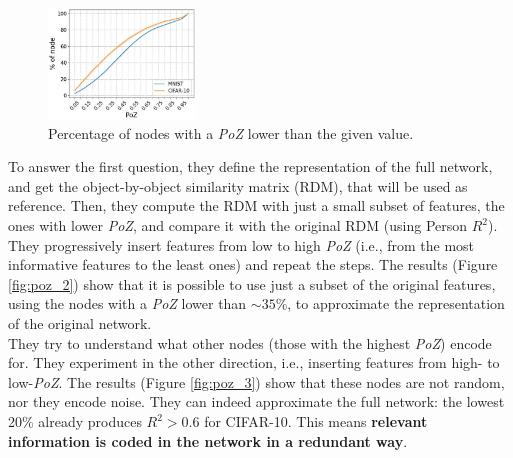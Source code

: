 \begin{figure}
  \centering
  \includegraphics[width=0.35\textwidth]{images/poz.png}
  \caption{Percentage of nodes with a \textit{PoZ} lower than the given value.}
  \label{fig:poz}
\end{figure}

To answer the first question, they define the representation of the full network, and get the object-by-object similarity matrix (RDM), that will be used as reference. Then, they compute the RDM with just a small subset of features, the ones with lower \textit{PoZ}, and compare it with the original RDM (using Person $R^2$). They progressively insert features from low to high \textit{PoZ} (i.e., from the most informative features to the least ones) and repeat the steps. The results (Figure \ref{fig:poz_2}) show that it is possible to use just a subset of the original features, using the nodes with a \textit{PoZ} lower than $\sim35\%$, to approximate the representation of the original network.\\

They try to understand what other nodes (those with the highest \textit{PoZ}) encode for. They experiment in the other direction, i.e., inserting features from high- to low-\textit{PoZ}. The results (Figure \ref{fig:poz_3}) show that these nodes are not random, nor they encode noise. They can indeed approximate the full network: the lowest 20\% already produces $R^2>0.6$ for CIFAR-10. This means \textbf{relevant information is coded in the network in a redundant way}.



